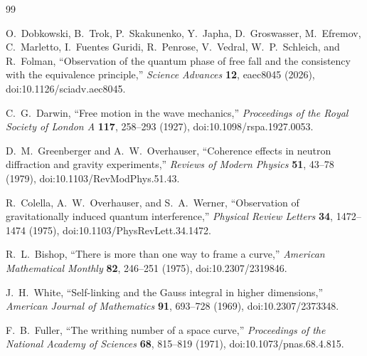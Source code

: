 \begin{thebibliography}{99}

O.~Dobkowski, B.~Trok, P.~Skakunenko, Y.~Japha, D.~Groswasser,
M.~Efremov, C.~Marletto, I.~Fuentes Guridi, R.~Penrose,
V.~Vedral, W.~P.~Schleich, and R.~Folman,
``Observation of the quantum phase of free fall and the consistency with the equivalence principle,''
\emph{Science Advances} \textbf{12}, eaec8045 (2026),
doi:10.1126/sciadv.aec8045.

C.~G.~Darwin,
``Free motion in the wave mechanics,''
\emph{Proceedings of the Royal Society of London A} \textbf{117}, 258--293 (1927),
doi:10.1098/rspa.1927.0053.

D.~M.~Greenberger and A.~W.~Overhauser,
``Coherence effects in neutron diffraction and gravity experiments,''
\emph{Reviews of Modern Physics} \textbf{51}, 43--78 (1979),
doi:10.1103/RevModPhys.51.43.

R.~Colella, A.~W.~Overhauser, and S.~A.~Werner,
``Observation of gravitationally induced quantum interference,''
\emph{Physical Review Letters} \textbf{34}, 1472--1474 (1975),
doi:10.1103/PhysRevLett.34.1472.

R.~L.~Bishop,
``There is more than one way to frame a curve,''
\emph{American Mathematical Monthly} \textbf{82}, 246--251 (1975),
doi:10.2307/2319846.

J.~H.~White,
``Self-linking and the Gauss integral in higher dimensions,''
\emph{American Journal of Mathematics} \textbf{91}, 693--728 (1969),
doi:10.2307/2373348.

F.~B.~Fuller,
``The writhing number of a space curve,''
\emph{Proceedings of the National Academy of Sciences} \textbf{68}, 815--819 (1971),
doi:10.1073/pnas.68.4.815.

\end{thebibliography}

